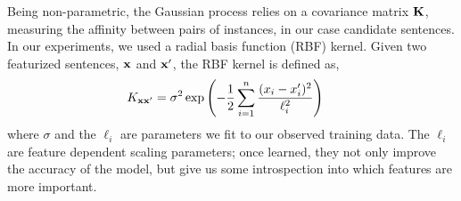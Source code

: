 Being non-parametric, the Gaussian process relies on a  covariance matrix $\mathbf{K}$, measuring the affinity between pairs of instances, in our case candidate sentences.  In our experiments, we used a radial basis function (RBF) kernel.  Given two featurized sentences, $\mathbf{x}$ and $\mathbf{x}^\prime$, the RBF kernel is defined as,
\begin{align*}
        K_{\mathbf{x}\mathbf{x}^\prime}&= \sigma^2 \exp\left(- \frac{1}{2} 
\sum_{i=1}^{n} \frac{ (x_{i}-x_{i}^\prime)^2}{\ell_i^2} \right)
\end{align*}
where $\sigma$ and the $\ell_i$ are parameters we fit to our observed training data. The $\ell_i$ are feature dependent scaling parameters; once learned, they not only improve the accuracy of the model, but give us some introspection  into which features are more important.


%
%
%
%
%
%
%
